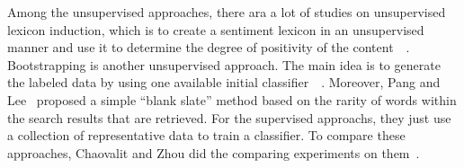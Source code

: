 Among the unsupervised approaches, there ara a lot of studies on unsupervised lexicon induction, which is to create a sentiment lexicon in an unsupervised manner and use it to determine the degree of positivity of the content~\cite{hatzivassiloglou2000effects}~\cite{yu2003towards}. Bootstrapping is another unsupervised approach. The main idea is to generate the labeled data by using one available initial classifier~\cite{riloff2003learning}~\cite{wilson2005opinionfinder}. Moreover, Pang and Lee~\cite{thomas2006get} proposed a simple “blank slate” method based on the rarity of words within the search results that are retrieved. For the supervised approachs, they just use a collection of representative data to train a classifier. To compare these approaches, Chaovalit and Zhou did the comparing experiments on them~\cite{chaovalit2005movie}.








